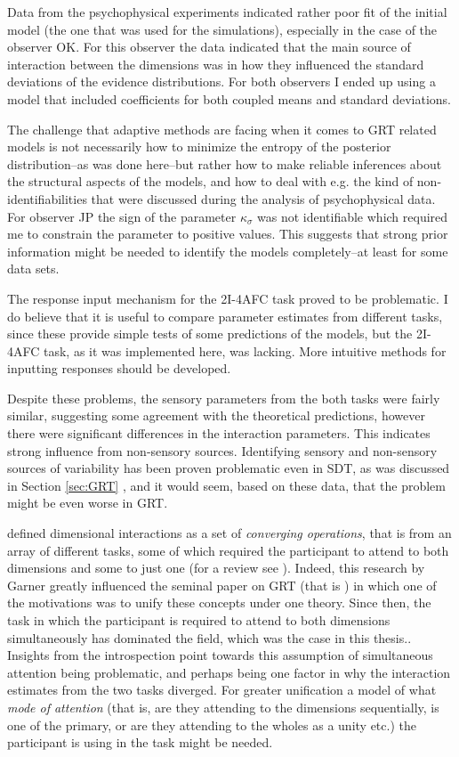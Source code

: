 \documentclass{article}\usepackage{knitr}
\begin{document}
Data from the psychophysical experiments indicated rather poor fit of the initial model (the one that was used for the simulations), especially in the case of the observer OK. For this observer the data indicated that the main source of interaction between the dimensions was in how they influenced the standard deviations of the evidence distributions. For both observers I ended up using a model that included coefficients for both coupled means and standard deviations. 

The challenge that adaptive methods are facing when it comes to GRT related models is not necessarily how to minimize the entropy of the posterior distribution--as was done here--but rather how to make reliable inferences about the structural aspects of the models, and how to deal with e.g. the kind of non-identifiabilities that were discussed during the analysis of psychophysical data. For observer JP the sign of the parameter $\kappa_{\sigma}$ was not identifiable which required me to constrain the parameter to positive values. This suggests that strong prior information might be needed to identify the models completely--at least for some data sets.

The response input mechanism for the 2I-4AFC task proved to be problematic. I do believe that it is useful to compare parameter estimates from different tasks, since these provide  simple tests of  some predictions of the models, but the 2I-4AFC task, as it was implemented  here, was lacking. More intuitive methods for inputting responses should be developed. 

Despite these problems, the sensory parameters from the both tasks were fairly similar, suggesting some agreement with the theoretical predictions, however there were significant differences in the interaction parameters. This indicates strong influence from non-sensory sources. Identifying sensory and non-sensory sources of variability has been proven problematic even in SDT, as was discussed in Section \ref{sec:GRT} \textit{}, and it would seem, based on these data, that the problem might be even worse in GRT. 

\citet{garner1974} defined dimensional interactions as a set of \textit{converging operations}, that is from an array of different tasks, some of which required the participant to attend to both dimensions and some to just one (for a review see \citet{burns2014}). Indeed, this research by Garner greatly influenced the seminal paper on GRT (that is \citet{ashby1986}) in which one of the motivations was to unify these concepts under one theory. Since then, the task in which the participant is required to attend to both dimensions simultaneously has dominated the field, which was the case in this thesis.. Insights from the introspection point towards this assumption of simultaneous attention being problematic, and perhaps being one factor in why the interaction estimates from the two tasks diverged. For greater unification a model of what \textit{mode of attention} (that is, are they attending to the dimensions sequentially, is one of the primary, or are they attending to the wholes as a unity etc.) the participant is using in the task might be needed.
\end{document}

